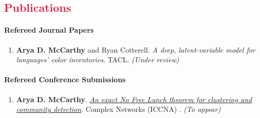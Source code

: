 \documentclass[margin, 10pt]{res} %
\let\oldsection\section
\renewcommand{\section}[1]{\oldsection{\textcolor{crimson}{#1}}}
\renewcommand{\oldstylenums}[1]{{\fontfamily{pplj}\selectfont #1}}
\begin{document}
\begin{resume}
\section{Publications}
\vspace{-0.1em}


\paragraph{Refereed Journal Papers}
\begin{enumerate}[resume]
\item \textbf{Arya D. McCarthy} and Ryan Cotterell. \emph{A deep, latent-variable model for languages' color inventories}. TACL. \emph{(Under review)}
\end{enumerate}

\paragraph{Refereed Conference Submissions}
\begin{enumerate}[resume]
\item \textbf{Arya D. McCarthy}. \href{https://cs.jhu.edu/~arya/mccarthy.iccna18.pdf}{\emph{An exact No Free Lunch theorem for clustering and community detection}}.  Complex Networks (ICCNA) \oldstylenums{2018}. \emph{(To appear)}


\end{enumerate}
\end{resume}
\end{document}
